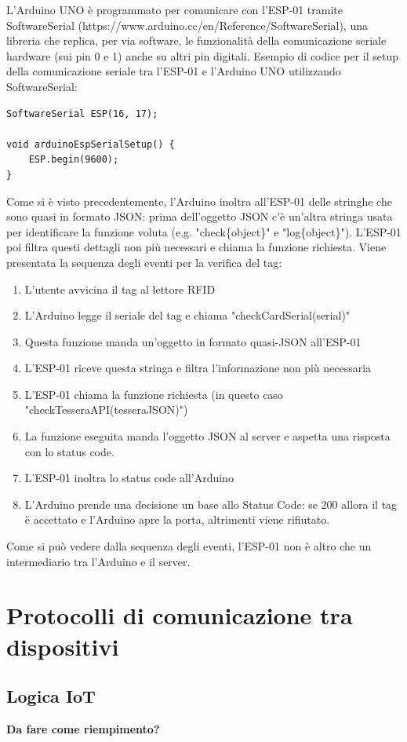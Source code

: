 \documentclass[12pt]{report}
\begin{document}
L'Arduino UNO è programmato per comunicare con l'ESP-01 tramite SoftwareSerial (https://www.arduino.cc/en/Reference/SoftwareSerial), una libreria che replica, per via software, le funzionalità della comunicazione seriale hardware (sui pin 0 e 1) anche su altri pin digitali. Esempio di codice per il setup della comunicazione seriale tra l'ESP-01 e l'Arduino UNO utilizzando SoftwareSerial:
\begin{lstlisting}
SoftwareSerial ESP(16, 17);

void arduinoEspSerialSetup() {
	ESP.begin(9600);
}
\end{lstlisting}
Come si è visto precedentemente, l'Arduino inoltra all'ESP-01 delle stringhe che sono quasi in formato JSON: prima dell'oggetto JSON c'è un'altra stringa usata per identificare la funzione voluta (e.g$.$ "check\{object\}" e "log\{object\}"). L'ESP-01 poi filtra questi dettagli non più necessari e chiama la funzione richiesta. Viene presentata la sequenza degli eventi per la verifica del tag:

\begin{enumerate}
	\item L'utente avvicina il tag al lettore RFID
	\item L'Arduino legge il seriale del tag e chiama "checkCardSerial(serial)"
	\item Questa funzione manda un'oggetto in formato quasi-JSON all'ESP-01
	\item L'ESP-01 riceve questa stringa e filtra l'informazione non più necessaria
	\item L'ESP-01 chiama la funzione richiesta (in questo caso "checkTesseraAPI(tesseraJSON)")
	\item La funzione eseguita manda l'oggetto JSON al server e aspetta una risposta con lo status code.
	\item L'ESP-01 inoltra lo status code all'Arduino
	\item L'Arduino prende una decisione un base allo Status Code: se 200 allora il tag è accettato e l'Arduino apre la porta, altrimenti viene rifiutato.
\end{enumerate}
Come si può vedere dalla sequenza degli eventi, l'ESP-01 non è altro che un intermediario tra l'Arduino e il server.
%
\section{Protocolli di comunicazione tra dispositivi}
%
%
\subsection{Logica IoT}
%
\textbf{Da fare come riempimento?}
\end{document}
